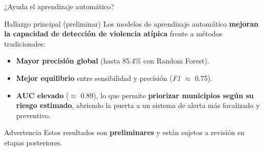 
\begin{frame}{¿Ayuda el aprendizaje automático?}
    \small
    \begin{block}{Hallazgo principal (preliminar)}
        Los modelos de aprendizaje automático \textbf{mejoran la capacidad de detección de violencia atípica} frente a métodos tradicionales:
        \begin{itemize}
            \item \textbf{Mayor precisión global} (hasta 85.4\% con Random Forest).
            \item \textbf{Mejor equilibrio} entre sensibilidad y precisión (\textit{F1} $\approx$ 0.75).
            \item \textbf{AUC elevado} ($\approx$ 0.89), lo que permite \textbf{priorizar municipios según su riesgo estimado}, abriendo la puerta a un sistema de alerta más focalizado y preventivo.
        \end{itemize}
    \end{block}

    \vspace{0.2cm}
    \begin{block}{Advertencia}
        Estos resultados son \textbf{preliminares} y están sujetos a revisión en etapas posteriores.
    \end{block}
\end{frame}